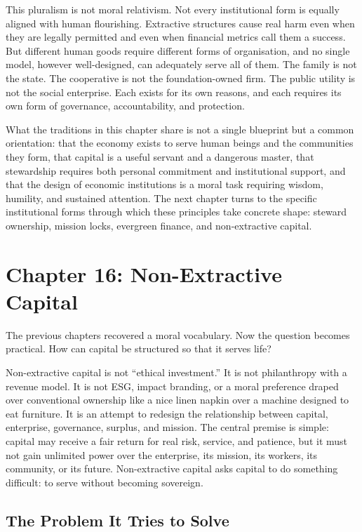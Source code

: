 \documentclass[11pt,a4paper,oneside]{book}
\begin{document}
This pluralism is not moral relativism. Not every institutional form is equally aligned with human flourishing. Extractive structures cause real harm even when they are legally permitted and even when financial metrics call them a success. But different human goods require different forms of organisation, and no single model, however well-designed, can adequately serve all of them. The family is not the state. The cooperative is not the foundation-owned firm. The public utility is not the social enterprise. Each exists for its own reasons, and each requires its own form of governance, accountability, and protection.

What the traditions in this chapter share is not a single blueprint but a common orientation: that the economy exists to serve human beings and the communities they form, that capital is a useful servant and a dangerous master, that stewardship requires both personal commitment and institutional support, and that the design of economic institutions is a moral task requiring wisdom, humility, and sustained attention. The next chapter turns to the specific institutional forms through which these principles take concrete shape: steward ownership, mission locks, evergreen finance, and non-extractive capital.

\chapter*{Chapter 16: Non-Extractive Capital}

The previous chapters recovered a moral vocabulary. Now the question becomes practical. How can capital be structured so that it serves life?

Non-extractive capital is not ``ethical investment.'' It is not philanthropy with a revenue model. It is not ESG, impact branding, or a moral preference draped over conventional ownership like a nice linen napkin over a machine designed to eat furniture. It is an attempt to redesign the relationship between capital, enterprise, governance, surplus, and mission. The central premise is simple: capital may receive a fair return for real risk, service, and patience, but it must not gain unlimited power over the enterprise, its mission, its workers, its community, or its future. Non-extractive capital asks capital to do something difficult: to serve without becoming sovereign.

\section*{The Problem It Tries to Solve}
\end{document}
